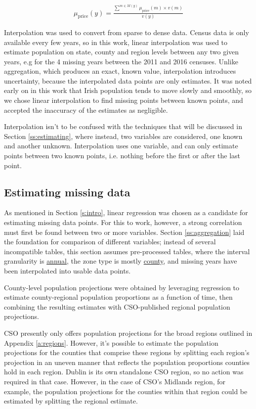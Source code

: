 \documentclass[twocolumn]{article}
\begin{document}
\begin{align}
    \mu_{\text{price}}(y) = \frac{\sum^{m \in M(y)}\mu_{\text{price}}(m) \times v(m)}
    {v(y)}\label{eq:weighted_mean}
\end{align}

Interpolation was used to convert from sparse to dense data.  Census data
is only available every few years, so in this work, linear interpolation was
used to estimate population on state, county and region levels between any two
given years, e.g for the 4 missing years between the 2011 and 2016 censuses.
Unlike aggregation, which produces an
exact, known value, interpolation introduces uncertainty, because the
interpolated data points are only estimates.  It was noted early on in this
work that Irish population tends to move slowly and smoothly, so we chose
linear interpolation to find missing points between known points, and accepted
the inaccuracy of the estimates as negligible.

Interpolation isn't to be confused with the techniques that will be discussed in
Section \ref{ss:estimating}, where instead, two variables are considered, one known
and another unknown.  Interpolation uses one variable, and can only estimate points between
two known points, i.e. nothing before the first or after the last point.

\subsection{Estimating missing data\label{ss:estimating}}
As mentioned in Section \ref{s:intro}, linear regression was chosen as a candidate for
estimating missing data points.  For this to work, however, a strong correlation must first
be found between two or more variables.  Section \ref{ss:aggregation} laid the foundation
for comparison of different variables; instead of several incompatible tables, this section assumes
pre-processed tables, where the interval granularity is \underline{annual}, the zone type is
mostly \underline{county}, and missing years have been interpolated into usable data points.

County-level population projections were obtained by leveraging
regression to estimate county-regional population proportions as a function of
time, then combining the resulting estimates with CSO-published regional population
projections.

CSO presently only offers population projections for the broad
regions outlined in Appendix \ref{a:regions}.  However, it's possible to
estimate the population projections for the counties that comprise these
regions by splitting each region's projection in an uneven manner that
reflects the population proportions counties hold in each region.  Dublin is its
own standalone CSO region, so no action was required in that case.  However, in
the case of CSO's Midlands region, for example, the population projections for the counties
within that region could be estimated by splitting the regional estimate.
\end{document}
